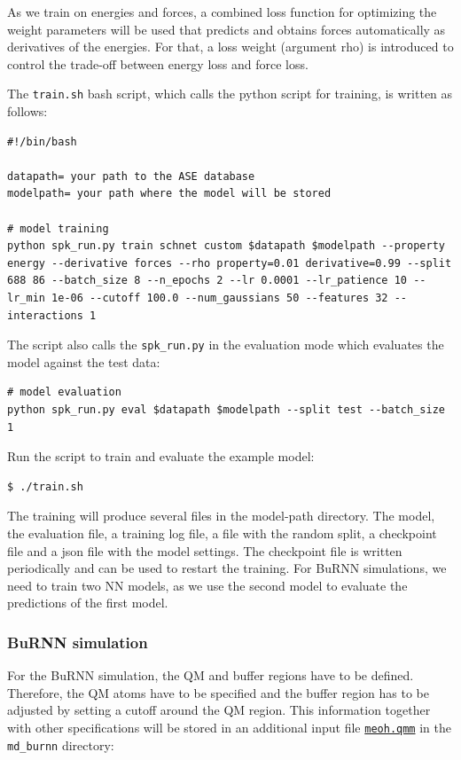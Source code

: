 As we train on energies and forces, a combined loss function for optimizing the weight parameters will be used that predicts and obtains forces automatically as derivatives of the energies. For that, a loss weight (argument rho) is introduced to control the trade-off between energy loss and force loss.

The \texttt{train.sh} bash script, which calls the python script for training, is written as follows:
\begin{lstlisting}[breaklines=true, breakatwhitespace=false]
#!/bin/bash

datapath= your path to the ASE database
modelpath= your path where the model will be stored

# model training
python spk_run.py train schnet custom $datapath $modelpath --property energy --derivative forces --rho property=0.01 derivative=0.99 --split 688 86 --batch_size 8 --n_epochs 2 --lr 0.0001 --lr_patience 10 --lr_min 1e-06 --cutoff 100.0 --num_gaussians 50 --features 32 --interactions 1
\end{lstlisting}

The script also calls the \texttt{spk\_run.py} in the evaluation mode which evaluates the model against the test data:

\begin{lstlisting}[breaklines=true, breakatwhitespace=false]
# model evaluation
python spk_run.py eval $datapath $modelpath --split test --batch_size 1
\end{lstlisting}

Run the script to train and evaluate the example model:

\begin{lstlisting}[breaklines=true, breakatwhitespace=false]
$ ./train.sh
\end{lstlisting}

The training will produce several files in the model-path directory. The model, the evaluation file, a training log file, a file with the random split, a checkpoint file and a json file with the model settings. The checkpoint file is written periodically and can be used to restart the training. For BuRNN simulations, we need to train two NN models, as we use the second model to evaluate the predictions of the first model.



\subsubsection{BuRNN simulation}
For the BuRNN simulation, the QM and buffer regions have to be defined. Therefore, the QM atoms have to be specified and the buffer region has to be adjusted by setting a cutoff around the QM region. This information together with other specifications will be stored in an additional input file \href{https://github.com/LierB/gromos_tutorial_livecoms/blob/burnn_tutorial_rc/tutorial_files/t_06/md_burnn/meoh.qmm}{\texttt{meoh.qmm}} in the \texttt{md\_burnn} directory:

